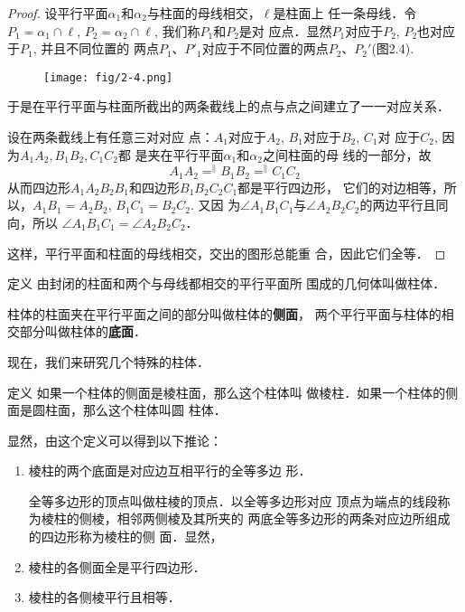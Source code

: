 \begin{proof}
    设平行平面$\alpha_1$和$\alpha_2$与柱面的母线相交，$\ell$是柱面上
任一条母线．令$P_1=\alpha_1\cap \ell$, $P_2=\alpha_2\cap\ell$, 我们称$P_1$和$P_2$是对
应点．显然$P_1$对应于$P_2$, $P_2$也对应于$P_1$, 并且不同位置的
两点$P_1$、$P'_1$对应于不同位置的两点$P_2$、$P_2'$(图2.4).

\begin{figure}[htp]
    \centering
\texttt{[image: fig/2-4.png]}
    \caption{}
\end{figure}


于是在平行平面与柱面所截出的两条截线上的点与点之间建立了一一对应关系．

设在两条截线上有任意三对对应
点：$A_1$对应于$A_2$, $B_1$对应于$B_2$, $C_1$对
应于$C_2$, 因为$A_1A_2,B_1B_2,C_1C_2$都
是夹在平行平面$\alpha_1$和$\alpha_2$之间柱面的母
线的一部分，故
\[A_1A_2\mathop{=}^{\parallel} B_1B_2\mathop{=}^{\parallel}C_1C_2\]
从而四边形$A_1A_2B_2B_1$和四边形$B_1B_2C_2C_1$都是平行四边形，
它们的对边相等，所以，$A_1B_1=A_2B_2$, $B_1C_1=B_2C_2$. 又因
为$\angle A_1B_1C_1$与$\angle A_2B_2C_2$的两边平行且同向，所以
$\angle A_1B_1C_1=\angle A_2B_2C_2$．

这样，平行平面和柱面的母线相交，交出的图形总能重
合，因此它们全等．
\end{proof}


\begin{blk}{定义} 
    由封闭的柱面和两个与母线都相交的平行平面所
围成的几何体叫做柱体．

柱体的柱面夹在平行平面之间的部分叫做柱体的\textbf{侧面}，
两个平行平面与柱体的相交部分叫做柱体的\textbf{底面}．
    
\end{blk}

现在，我们来研究几个特殊的柱体．

\begin{blk}{定义} 
    如果一个柱体的侧面是棱柱面，那么这个柱体叫
做棱柱．如果一个柱体的侧面是圆柱面，那么这个柱体叫圆
柱体．    
\end{blk}

显然，由这个定义可以得到以下推论：
\begin{enumerate}
\item 棱柱的两个底面是对应边互相平行的全等多边
形．

全等多边形的顶点叫做柱棱的顶点．以全等多边形对应
顶点为端点的线段称为棱柱的侧棱，相邻两侧棱及其所夹的
两底全等多边形的两条对应边所组成的四边形称为棱柱的侧
面．显然，
\item 棱柱的各侧面全是平行四边形．
\item 棱柱的各侧棱平行且相等．
\end{enumerate}


